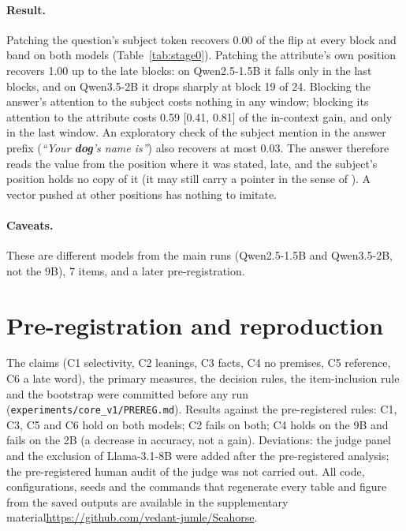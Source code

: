 \documentclass[11pt]{article}
\newcommand{\codeavail}{\ifdefined\REVIEW the supplementary material\else \url{https://github.com/vedant-jumle/Seahorse}\fi}
\begin{document}
\paragraph{Result.} Patching the question's subject token recovers 0.00 of the flip at every block and band on both models (Table~\ref{tab:stage0}). Patching the attribute's own position recovers 1.00 up to the late blocks: on Qwen2.5-1.5B it falls only in the last blocks, and on Qwen3.5-2B it drops sharply at block 19 of 24. Blocking the answer's attention to the subject costs nothing in any window; blocking its attention to the attribute costs 0.59 [0.41, 0.81] of the in-context gain, and only in the last window. An exploratory check of the subject mention in the answer prefix (\textit{``Your \textbf{dog}'s name is''}) also recovers at most 0.03. The answer therefore reads the value from the position where it was stated, late, and the subject's position holds no copy of it (it may still carry a pointer in the sense of \citet{prakash2026lookbacks}). A vector pushed at other positions has nothing to imitate.

\paragraph{Caveats.} These are different models from the main runs (Qwen2.5-1.5B and Qwen3.5-2B, not the 9B), 7 items, and a later pre-registration.

\section{Pre-registration and reproduction}
\label{app:prereg}

The claims (C1 selectivity, C2 leanings, C3 facts, C4 no premises, C5 reference, C6 a late word), the primary measures, the decision rules, the item-inclusion rule and the bootstrap were committed before any run (\texttt{experiments/core\_v1/PREREG.md}). Results against the pre-registered rules: C1, C3, C5 and C6 hold on both models; C2 fails on both; C4 holds on the 9B and fails on the 2B (a decrease in accuracy, not a gain). Deviations: the judge panel and the exclusion of Llama-3.1-8B were added after the pre-registered analysis; the pre-registered human audit of the judge was not carried out. All code, configurations, seeds and the commands that regenerate every table and figure from the saved outputs are available in \codeavail.
\end{document}
